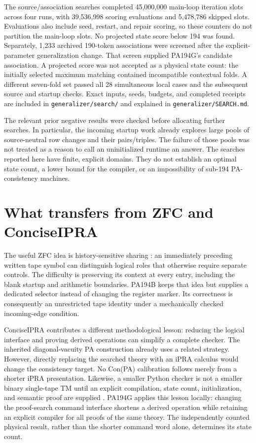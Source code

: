 \documentclass[11pt]{article}
\newcommand{\file}[1]{\nolinkurl{#1}}
\begin{document}
The source/association searches completed 45,000,000 main-loop iteration
slots across four runs, with 39,536,998 scoring evaluations and 5,478,786
skipped slots. Evaluations also include seed, restart, and repair scoring,
so these counters do not partition the main-loop slots. No projected
state score below 194 was found. Separately, 1,233 archived 190-token
associations were screened after the explicit-parameter generalization
change. That screen supplied PA194G's candidate association. A projected
score was not accepted as a physical state count: the initially selected
maximum matching contained incompatible contextual folds. A different
seven-fold set passed all 28 simultaneous local cases and the subsequent
source and startup checks. Exact inputs, seeds, budgets, and completed
receipts are included in \file{generalizer/search/} and explained in
\file{generalizer/SEARCH.md}.

The relevant prior negative results were checked before allocating further
searches. In particular, the incoming startup work already explores large
pools of source-neutral row changes and their pairs/triples. The failure
of those pools was not treated as a reason to call an uninitialized runtime
an answer. The searches reported here have finite, explicit domains. They
do not establish an optimal state count, a lower bound for the compiler, or
an impossibility of sub-194 PA-consistency machines.

\section{What transfers from ZFC and ConciseIPRA}
The useful ZFC idea is history-sensitive sharing \cite{zfc}: an immediately preceding
written tape symbol can distinguish logical roles that otherwise require
separate controls. The difficulty is preserving its context at every entry,
including the blank startup and arithmetic boundaries. PA194B keeps that
idea but supplies a dedicated selector instead of changing the register
marker. Its correctness is consequently an unrestricted tape identity
under a mechanically checked incoming-edge condition.

ConciseIPRA contributes a different methodological lesson: reducing the
logical interface and proving derived operations can simplify a complete
checker. The inherited diagonal-vacuity PA construction already uses a
related strategy. However, directly replacing the searched theory with an
iPRA calculus would change the consistency target. No Con(PA) calibration
follows merely from a shorter iPRA presentation. Likewise, a smaller Python
checker is not a smaller binary single-tape TM until an explicit compilation,
state count, initialization, and semantic proof are supplied \cite{concise}.
PA194G applies this lesson locally: changing the proof-search command
interface shortens a derived operation while retaining an explicit compiler
for all proofs of the same theory. The independently counted physical
result, rather than the shorter command word alone, determines its state
count.
\end{document}
